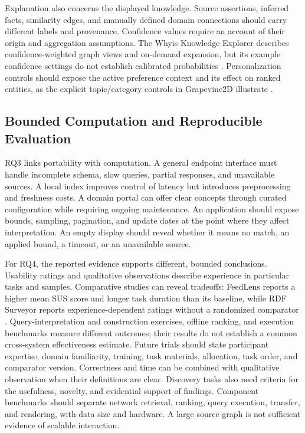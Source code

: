 \documentclass[manuscript,review,screen]{acmart}
\begin{document}
Explanation also concerns the displayed knowledge. Source assertions, inferred facts, similarity edges, and manually defined domain connections should carry different labels and provenance. Confidence values require an account of their origin and aggregation assumptions. The Whyis Knowledge Explorer describes confidence-weighted graph views and on-demand expansion, but its example confidence settings do not establish calibrated probabilities \citep{V3-00740}. Personalization controls should expose the active preference context and its effect on ranked entities, as the explicit topic/category controls in Grapevine2D illustrate \citep{V3-00694}.

\subsection{Bounded Computation and Reproducible Evaluation}
RQ3 links portability with computation. A general endpoint interface must handle incomplete schema, slow queries, partial responses, and unavailable sources. A local index improves control of latency but introduces preprocessing and freshness costs. A domain portal can offer clear concepts through curated configuration while requiring ongoing maintenance. An application should expose bounds, sampling, pagination, and update dates at the point where they affect interpretation. An empty display should reveal whether it means no match, an applied bound, a timeout, or an unavailable source.

For RQ4, the reported evidence supports different, bounded conclusions. Usability ratings and qualitative observations describe experience in particular tasks and samples. Comparative studies can reveal tradeoffs: FeedLens reports a higher mean SUS score and longer task duration than its baseline, while RDF Surveyor reports experience-dependent ratings without a randomized comparator \citep{V3-01126,V3-01765}. Query-interpretation and construction exercises, offline ranking, and execution benchmarks measure different outcomes; their results do not establish a common cross-system effectiveness estimate. Future trials should state participant expertise, domain familiarity, training, task materials, allocation, task order, and comparator version. Correctness and time can be combined with qualitative observation when their definitions are clear. Discovery tasks also need criteria for the usefulness, novelty, and evidential support of findings. Component benchmarks should separate network retrieval, ranking, query execution, transfer, and rendering, with data size and hardware. A large source graph is not sufficient evidence of scalable interaction.
\end{document}
